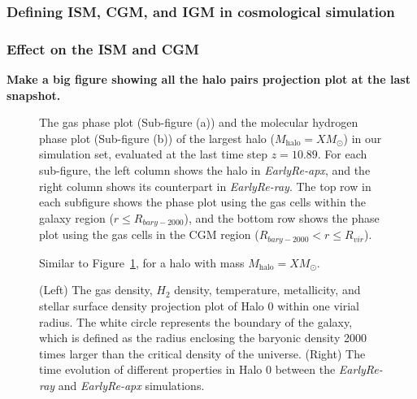 \documentclass[linenumbers, twocolumn]{aastex631}
\begin{document}
\subsubsection{Defining ISM, CGM, and IGM in cosmological simulation}

\subsubsection{Effect on the ISM and CGM}


\textbf{Make a big figure showing all the halo pairs projection plot at the last snapshot.}

\begin{figure}
    \caption{The gas phase plot (Sub-figure (a)) and the molecular hydrogen phase plot (Sub-figure (b)) of the largest halo ($M_{\mathrm{halo}} = X M_\odot$) in our simulation set, evaluated at the last time step $z = 10.89$. For each sub-figure, the left column shows the halo in \textit{EarlyRe-apx}, and the right column shows its counterpart in \textit{EarlyRe-ray}. The top row in each subfigure shows the phase plot using the gas cells within the galaxy region ($r \leq R_{bary-2000}$), and the bottom row shows the phase plot using the gas cells in the CGM region ($R_{bary-2000} < r \leq R_{vir}$).} 
    \label{fig:phaseplot_Halo0-0}
\end{figure}

\begin{figure}
    \caption{Similar to Figure~\ref{fig:phaseplot_Halo0-0}, for a halo with mass $M_{\mathrm{halo}} = X M_\odot$.}
    \label{fig:phaseplot_Halo3-3}
\end{figure}

\begin{figure}
    \caption{(Left) The gas density, $H_{2}$ density, temperature, metallicity, and stellar surface density projection plot of Halo 0 within one virial radius. The white circle represents the boundary of the galaxy, which is defined as the radius enclosing the baryonic density 2000 times larger than the critical density of the universe. (Right) The time evolution of different properties in Halo 0 between the \textit{EarlyRe-ray} and \textit{EarlyRe-apx} simulations.}
    \label{fig:Halo0-0_comparison}
\end{figure}
\end{document}

